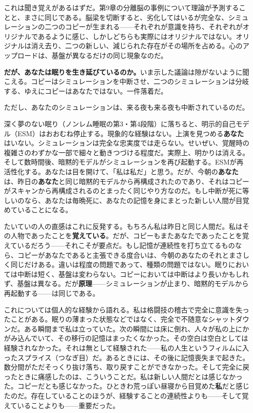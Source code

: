 \documentclass[11pt, twoside, openright]{book}
\begin{document}
これは聞き覚えがあるはずだ。第9章の分離脳の事例について理論が予測することと、まさに同じである。脳梁を切断すると、劣化してはいるが完全な、シミュレーションの二つのコピーが生まれる------それぞれが意識を持ち、それぞれがオリジナルであるように感じ、しかしどちらも実際にはオリジナルではない。オリジナルは消え去り、二つの新しい、減じられた存在がその場所を占める。心のアップロードは、基盤が異なるだけの同じ現象なのだ。

\textbf{だが、あなたは眠りを生き延びているのか。}いま示した議論は隙がないように聞こえる。コピーはシミュレーションを中断させ、二つのシミュレーションは分岐する、ゆえにコピーはあなたではない。一件落着だ。

ただし、あなたのシミュレーションは、来る夜も来る夜も中断されているのだ。

深く夢のない眠り（ノンレム睡眠の第3・第4段階）に落ちると、明示的自己モデル（ESM）はおおむね停止する。現象的な経験はない。上演を見つめる\textbf{あなた}はいない。シミュレーションは完全な忠実度では走らない。せいぜい、覚醒時の複雑さのわずかな一部で細々と動きつづける程度だ。実際上、明かりは消える。そして数時間後、暗黙的モデルがシミュレーションを再び起動する。ESMが再活性化する。あなたは目を開けて、「私は私だ」と思う。だが、今朝の\textbf{あなた}は、昨日の\textbf{あなた}と同じ暗黙的モデルから再構成されたのであり、それはコピーがスキャンから再構成されるのとまったく同じやり方なのだ。もし中断が死に等しいのなら、あなたは毎晩死に、あなたの記憶を身にまとった新しい人間が目覚めていることになる。

たいていの人の直感はこれに反発する。もちろん私は昨日と同じ人間だ。私はその人物であったことを\textbf{覚えている}。だが、コピーもまたあなたであったことを覚えているだろう------それこそが要点だ。もし記憶が連続性を打ち立てるものなら、コピーがあなたであると主張できる度合いは、今朝のあなたのそれとまさしく同じだけある。違いは程度の問題であって、種類の問題ではない。眠りにおいては中断は短く、基盤は変わらない。コピーにおいては中断はより長いかもしれず、基盤は異なる。だが\textbf{原理}------シミュレーションが止まり、暗黙的モデルから再起動する------は同じである。

これについては個人的な経験から語れる。私は格闘技の稽古で完全に意識を失ったことがある。眠りの薄まった状態などではなく、完全で不随意なシャットダウンだ。ある瞬間まで私は立っていた。次の瞬間には床に倒れ、人々が私の上にかがみ込んでいて、その移行の記憶はまったくなかった。その空白は空白としては経験されなかった。それは無として経験された------私の人生というフィルムに入ったスプライス（つなぎ目）だ。あるときには、その後に記憶喪失まで起きた。数分間がただそっくり抜け落ち、取り戻すことができなかった。そして完全に戻ったときに痛感したのは、こういうことだ。私は新しい人間だとは感じなかった。コピーだとも感じなかった。ひときわ荒っぽい昼寝から目覚めた\textbf{私}だと感じたのだ。存在していることのほうが、経験することの連続性よりも------そして覚えていることよりも------重要だった。
\end{document}
